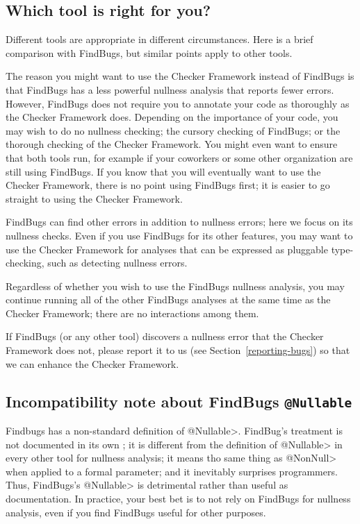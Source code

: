 \subsection{Which tool is right for you?\label{choosing-nullness-tool}}

Different tools are appropriate in different circumstances.  Here is a
brief comparison with FindBugs, but similar points apply to other tools.

The reason you might want to use the Checker Framework instead of FindBugs
is that FindBugs has a less powerful nullness analysis that reports fewer
errors.  However, FindBugs does not require you to annotate your code as
thoroughly as the Checker Framework does.  Depending on the importance of
your code, you may wish to do no nullness checking; the cursory checking of
FindBugs; or the thorough checking of the Checker Framework.  You might
even want to ensure that both tools run, for example if your coworkers or
some other organization are still using FindBugs.  If you know that you
will eventually want to use the Checker Framework, there is no point using
FindBugs first; it is easier to go straight to using the Checker Framework.

FindBugs can find other errors in addition to nullness errors; here
we focus on its nullness checks.  Even if you use FindBugs for its other
features, you may want to use the Checker Framework for analyses that can
be expressed as pluggable type-checking, such as detecting nullness errors.

Regardless of whether you wish to use the FindBugs nullness analysis, you
may continue running all of the other FindBugs analyses at the same time as
the Checker Framework; there are no interactions among them.

If FindBugs (or any other tool) discovers a nullness error that the Checker
Framework does not, please report it to us (see
Section~\ref{reporting-bugs}) so that we can enhance the Checker Framework.



\subsection{Incompatibility note about FindBugs \tt{@Nullable}\label{findbugs-nullable}}

Findbugs has a non-standard definition of \<@Nullable>.  FindBug's treatment is not
documented in its own
;
it is different from the definition of \<@Nullable> in every other tool for
nullness analysis; it means tho same thing as \<@NonNull> when applied to a
formal parameter; and it inevitably surprises programmers.  Thus, FindBugs's
\<@Nullable> is detrimental rather than useful as documentation.
In practice, your best bet is to not rely on FindBugs for nullness analysis,
even if you find FindBugs useful for other purposes.

